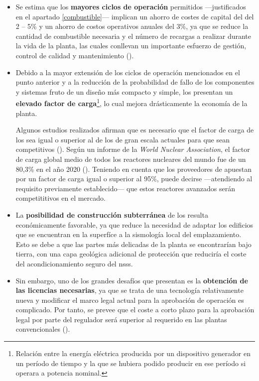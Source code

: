 \begin{itemize}
  \item Se estima que los \textbf{mayores ciclos de operación} permitidos ---justificados en el apartado \ref{combustible}--- implican un ahorro de costes de capital del del 2 – 5\% y un ahorro de costos operativos anuales del 3\%, ya que se reduce la cantidad de combustible necesaria y el número de recargas a realizar durante la vida de la planta, las cuales conllevan un importante esfuerzo de gestión, control de calidad y mantenimiento (\cite{overview_smrs}).
  
  \item Debido a la mayor extensión de los ciclos de operación mencionados en el punto anterior y a la reducción de la probabilidad de fallo de los componentes y sistemas fruto de un diseño más compacto y simple, los  presentan un \textbf{elevado \gls{factor de carga}}\footnote{Relación entre la energía eléctrica producida por un dispositivo generador en un período de tiempo y la que se hubiera podido producir en ese período si operara a potencia nominal.}, lo cual mejora drásticamente la economía de la planta. 
  
  Algunos estudios realizados afirman que es necesario que el factor de carga de los  sea igual o superior al de los  de gran escala actuales para que sean competitivos (\cite{SHROPSHIRE2011299}). Según un informe de la \emph{World Nuclear Association}, el factor de carga global medio de todos los reactores nucleares del mundo fue de un 80,3\% en el año 2020 (\cite{wna_report_2021}). Teniendo en cuenta que los proveedores de  apuestan por un factor de carga igual o superior al 95\%, puede decirse ---atendiendo al requisito previamente establecido--- que estos reactores avanzados serán competititivos en el mercado.
  
  \item La \textbf{posibilidad de construcción subterránea} de los  resulta económicamente favorable, ya que reduce la necesidad de adaptar los edificios que se encuentran en la superfíce a la sismología local del emplazamiento. Esto se debe a que las partes más delicadas de la planta se encontrarían bajo tierra, con una capa geológica adicional de protección que reduciría el coste del acondicionamiento seguro del \acrshort{nsss}.
  
  \item Sin embargo, uno de los grandes desafíos que presentan es la \textbf{obtención de las licencias necesarias}, ya que se trata de una tecnología relativamente nueva y modificar el marco legal actual para la aprobación de operación es complicado. Por tanto, se prevee que el coste a corto plazo para la aprobación legal por parte del regulador será superior al requerido en las plantas convencionales (\cite{uxc2015historical}).
  
\end{itemize}

